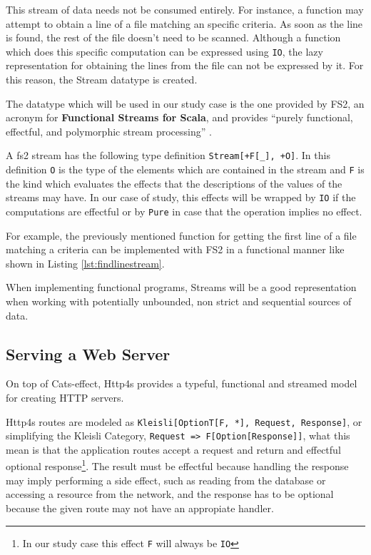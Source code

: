 \documentclass[../main.tex]{subfiles}
\begin{document}
This stream of data needs not be consumed entirely. For instance, a function may attempt to
obtain a line of a file matching an specific criteria. As soon as the line is
found, the rest of the file doesn't need to be scanned. Although a function which does
this specific computation can be expressed using \texttt{IO}, the lazy
representation for obtaining the lines from the file can not be expressed by it. For this
reason, the Stream datatype is created.

The datatype which will be used in our study case is the one provided by FS2, 
an acronym for \textbf{Functional Streams for Scala}, and provides ``purely
functional, effectful, and polymorphic stream processing'' \autocite{Fs2:Home}.

A fs2 stream has the following type definition \texttt{Stream[+F[\_], +O]}. In
this definition \texttt{O} is the type of the elements which are contained in
the stream and \texttt{F} is the kind which evaluates the effects that the
descriptions of the values of the streams may have. In our case of study, this
effects will be wrapped by \texttt{IO} if the computations are effectful or by
\texttt{Pure} in case that the operation implies no effect.

For example, the previously mentioned function for getting the first line of a
file matching a criteria can be implemented with FS2 in a functional manner like
shown in Listing \ref{lst:findlinestream}.



When implementing functional programs, Streams will be a good representation when working with
potentially unbounded, non strict and sequential sources of data.

\subsection{Serving a Web Server}
On top of Cats-effect, Http4s provides a typeful, functional and streamed model
for creating HTTP servers.

Http4s routes are modeled as \mbox{\texttt{Kleisli[OptionT[F,
*], Request, Response]}}, or simplifying the Kleisli Category, \mbox{\lstinline{Request => F[Option[Response]]}},
what this mean is that the application routes accept a request and return and
effectful optional response\footnote{In our study case this effect \texttt{F}
  will always be \texttt{IO}}. The result must be effectful because handling the
response may imply performing a side effect, such as reading from the database or
accessing a resource from the network, and the response has to be optional
because the given route may not have an appropiate handler.
\end{document}
